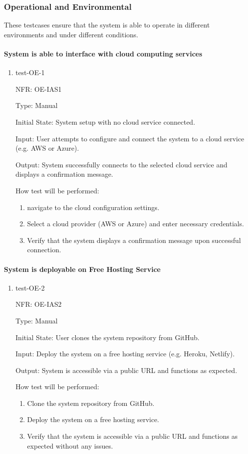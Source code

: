 \documentclass[12pt, titlepage]{article}
\begin{document}
\subsubsection{Operational and Environmental}
These testcases ensure that the system is able to operate in different environments and 
under different conditions.

\paragraph{System is able to interface with cloud computing services}
\begin{enumerate}
  \item{test-OE-1}

  NFR: OE-IAS1

  Type: Manual
            
  Initial State: System setup with no cloud service connected.
            
  Input:  User attempts to configure and connect the system to a cloud service (e.g. AWS or Azure).
            
  Output: System successfully connects to the selected cloud service and displays a confirmation message.
            
  How test will be performed: 
  \begin{enumerate}
    \item navigate to the cloud configuration settings.
    \item Select a cloud provider (AWS or Azure) and enter necessary credentials.
    \item Verify that the system displays a confirmation message upon successful connection.
  \end{enumerate}
\end{enumerate}

\paragraph{System is deployable on Free Hosting Service}
\begin{enumerate}
  \item{test-OE-2}

  NFR: OE-IAS2

  Type: Manual
            
  Initial State: User clones the system repository from GitHub.
            
  Input:  Deploy the system on a free hosting service (e.g. Heroku, Netlify).
            
  Output: System is accessible via a public URL and functions as expected.
            
  How test will be performed: 
  \begin{enumerate}
    \item Clone the system repository from GitHub.
    \item Deploy the system on a free hosting service.
    \item Verify that the system is accessible via a public URL and functions as expected without any issues.
  \end{enumerate}
\end{enumerate}
\end{document}
